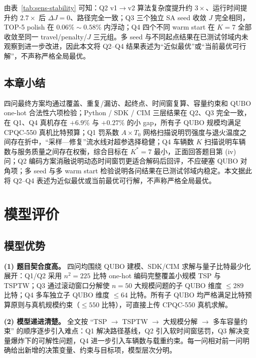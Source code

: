 \documentclass[UTF8,12pt,a4paper]{ctexart}
\begin{document}
由表~\ref{tab:sens-stability} 可知：Q2 v1$\to$v2 算法复杂度提升约 $3\times$、运行时间提升约 $2.7\times$ 后 $\Delta J\!=\!0$、路径完全一致；Q3 三个独立 SA seed 收敛 $J$ 完全相同，TOP-5 polish 在 $0.06\%\!\sim\!0.58\%$ 内浮动；Q4 四个不同 warm start 在 $K\!=\!7$ 全部收敛至同一 travel/penalty/$J$ 三元组。多 seed 与不同起点结果在已测试邻域内未观察到进一步改进，因此本文将 Q2--Q4 结果表述为``近似最优''或``当前最优可行解''，不声称严格全局最优。

\subsection{本章小结}

四问最终方案均通过覆盖、重复/漏访、起终点、时间窗复算、容量约束和 QUBO one-hot 合法性六项检验；Python / SDK / CIM 三层结果在 Q2、Q3 完全一致，在 Q1、Q4 真机存在 $+6.9\%$ 与 $+0.27\%$ 的小 gap，所有子 QUBO 规模均满足 CPQC-550 真机比特预算；Q1 罚系数 $A\!\times\!T_0$ 网格扫描说明罚强度与退火温度之间存在折中，``采样—修复''流水线对超参选择稳健；Q4 车辆数 $K$ 扫描说明车辆数与服务质量之间存在权衡，综合目标在 $K^*\!=\!7$ 最小，正面回答题目第 (iv) 问；Q2 编码方案消融说明动态时间窗罚更适合解码后回评，不应硬塞 QUBO 对角项；多 seed 与多 warm start 检验说明各问结果在已测试邻域内稳定。本文据此将 Q2--Q4 表述为近似最优或当前最优可行解，不声称严格全局最优。

\section{模型评价}

\subsection{模型优势}

\textbf{(1) 题目契合度高。} 四问均围绕 QUBO 建模、SDK/CIM 求解与量子比特最少化展开：Q1/Q2 采用 $n^2=225$ 比特 one-hot 编码完整覆盖小规模 TSP 与 TSPTW；Q3 通过滚动窗口分解使 $n=50$ 大规模问题的子 QUBO 维度 $\le 289$ 比特；Q4 多车独立子 QUBO 维度 $\le 64$ 比特。所有子 QUBO 均严格满足比特预算原则与真机规模约束（$\le 550$ 比特），可直接上传 CPQC-550 真机求解。

\textbf{(2) 模型递进清楚。} 全文按 ``TSP $\to$ TSPTW $\to$ 大规模分解 $\to$ 多车容量约束'' 的顺序逐步引入难点：Q1 解决路径基线，Q2 引入软时间窗惩罚，Q3 解决变量爆炸下的可解性问题，Q4 进一步引入车辆数与载重约束。每一问相对前一问明确给出新增的决策变量、约束与目标项，模型层次分明。
\end{document}
